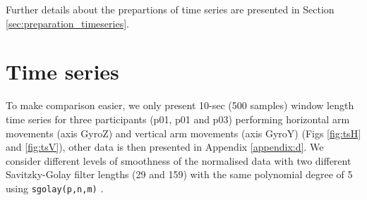 Further details about the prepartions of time series are presented in
Section \ref{sec:preparation_timeseries}.



\section{Time series}
To make comparison easier, we only present 10-sec (500 samples) window length 
time series for three participants (p01, p01 and p03) performing horizontal 
arm movements (axis GyroZ) and  vertical arm movements (axis GyroY) 
(Figs \ref{fig:tsH} and \ref{fig:tsV}), other data is then presented in 
Appendix \ref{appendix:d}.
We consider different levels of smoothness of the normalised data 
with two different Savitzky-Golay filter lengths (29 and 159) 
with the same polynomial degree of 5 using \texttt{sgolay(p,n,m)} 
\citep{Rsignal}.
 
